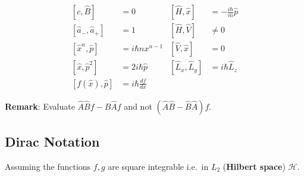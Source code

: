 \noindent\begin{align*}
    \left[c,\hat B\right]                        & =0                     & \left[\widehat{H},\widehat{x}\right]     & =-\frac{i\hbar}{m}\widehat{p} \\
    \left[\widehat{a}_{-},\widehat{a}_{+}\right] & = 1                    & \left[\widehat{H}, \widehat{V}\right]    & \neq 0                        \\
    \left[\widehat{x}^n,\widehat{p}\right]       & = i \hbar n x^{n-1}    & \left[\widehat{V},\widehat{x}\right]     & =0                            \\
    \left[\widehat{x},\widehat{p}^2\right]       & = 2i\hbar\widehat{p}   & \left[\widehat{L}_x,\widehat{L}_y\right] & =i\hbar\widehat{L}_z          \\
    \left[f(\widehat{x}),\widehat{p}\right]      & = i \hbar\frac{df}{dx} &                                          &
\end{align*}

\textbf{Remark}: Evaluate $\widehat{A}\widehat{B}f - \widehat{B}\widehat{A}f$ and not $(\widehat{A}\widehat{B} - \widehat{B}\widehat{A})f$.


\subsection{Dirac Notation}
Assuming the functions $f,g$ are square integrable i.e.\ in $L_2$ (\textbf{Hilbert space}) $\mathcal{H}$.

